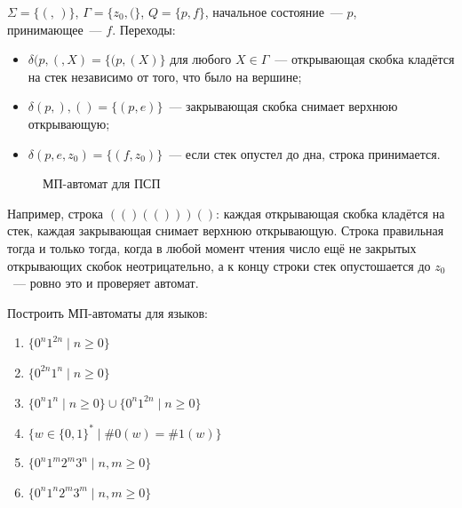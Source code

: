 \documentclass[12pt]{article}
\begin{document}
    \begin{example}
    	$\Sigma = \{ (,\, ) \}$, $\Gamma = \{ z_0, ( \}$, $Q = \{ p, f \}$, начальное состояние~--- $p$, принимающее~--- $f$. Переходы:
    	\begin{itemize}
    		\item $\delta(p, (, X) = \{ (p, (X) \}$ для любого $X \in \Gamma$~--- открывающая скобка кладётся на стек независимо от того, что было на вершине;
    		\item $\delta(p, ), () = \{ (p, e) \}$~--- закрывающая скобка снимает верхнюю открывающую;
    		\item $\delta(p, e, z_0) = \{ (f, z_0) \}$~--- если стек опустел до дна, строка принимается.
    	\end{itemize}
    	
    	\begin{figure}[H]
    		\centering
    		\caption{МП-автомат для ПСП}
    	\end{figure}
    	
    	Например, строка $(()(()))()$: каждая открывающая скобка кладётся на стек, каждая закрывающая снимает верхнюю открывающую. Строка правильная тогда и только тогда, когда в любой момент чтения число ещё не закрытых открывающих скобок неотрицательно, а к концу строки стек опустошается до $z_0$~--- ровно это и проверяет автомат.
    \end{example}
    
    \begin{problem}
    	Построить МП-автоматы для языков:
    	\begin{enumerate}
    		\item $\{ 0^n1^{2n} \mid n \geqslant 0 \}$
    		\item $\{ 0^{2n}1^n \mid n \geqslant 0 \}$
    		\item $\{ 0^n1^n \mid n \geqslant 0 \} \cup \{ 0^n1^{2n} \mid n \geqslant 0 \}$
    		\item $\{ w \in \{0,1\}^* \mid \#0(w) = \#1(w) \}$
    		\item $\{ 0^n1^m2^m3^n \mid n, m \geqslant 0 \}$
    		\item $\{ 0^n1^n2^m3^m \mid n, m \geqslant 0 \}$
    	\end{enumerate}
    \end{problem}
    
\end{document}
